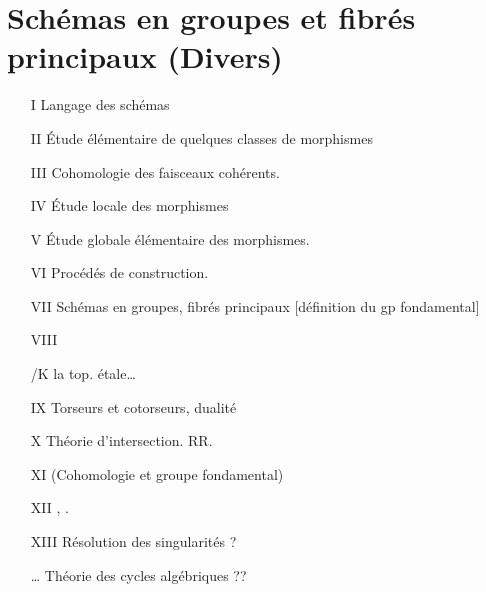 \documentclass[11pt,a4paper]{article}
\begin{document}
\section*{Schémas en groupes et fibrés principaux (Divers)}




\begin{itemize}
  \item[I] Langage des schémas
  \item[II] Étude élémentaire de quelques classes de morphismes
  \item[III] Cohomologie des faisceaux cohérents.
  \item[IV] Étude locale des morphismes
  \item[V] Étude globale élémentaire des  morphismes.
  \item[VI] Procédés de construction. 
  \item[VII] Schémas en groupes, fibrés principaux [définition du gp
  fondamental]
  \item[VIII] 
  \item[\struck{IX}] /K  \ill{}
  la top. étale\ldots
  \item[\struck{X}] \struck{\ill{}}
  \item[IX] Torseurs et cotorseurs, dualité
  \item[X] Théorie d'intersection. RR.
  \item[XI]  (Cohomologie
   et groupe fondamental)
  \item[XII]  \ill{}, \ill{} .
  \item[XIII] Résolution des singularités ?
  \item[\ldots] Théorie des cycles algébriques ??
\end{itemize}
\end{document}
